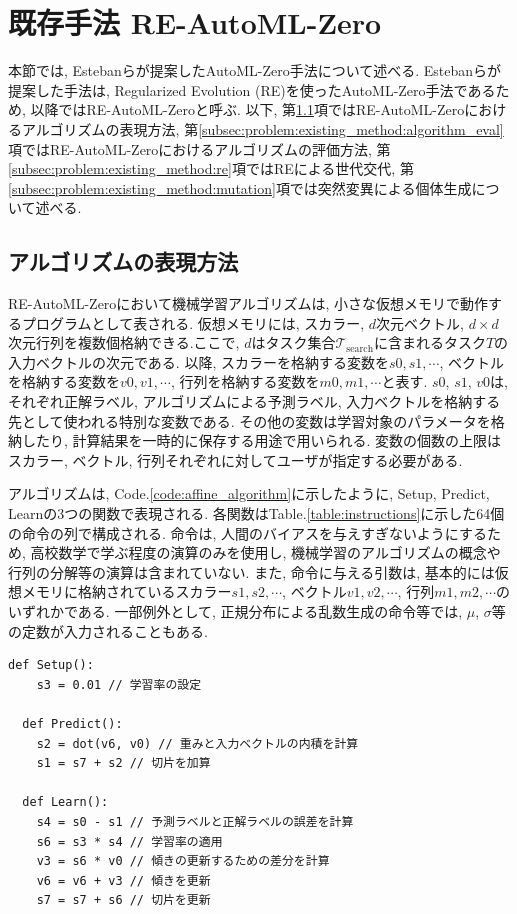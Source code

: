 \documentclass[11pt,oneside,openany,report]{jsbook}
\begin{document}
\section{既存手法 RE-AutoML-Zero}\label{sec:problem:re_automl_zero}

本節では, Estebanらが提案したAutoML-Zero手法について述べる. Estebanらが提案した手法は, Regularized Evolution (RE)を使ったAutoML-Zero手法であるため, 以降ではRE-AutoML-Zeroと呼ぶ. 以下, 第\ref{subsec:problem:existing_method:algorithm_exp}項ではRE-AutoML-Zeroにおけるアルゴリズムの表現方法, 第\ref{subsec:problem:existing_method:algorithm_eval}項ではRE-AutoML-Zeroにおけるアルゴリズムの評価方法, 第\ref{subsec:problem:existing_method:re}項ではREによる世代交代, 第\ref{subsec:problem:existing_method:mutation}項では突然変異による個体生成について述べる.

\subsection{アルゴリズムの表現方法}\label{subsec:problem:existing_method:algorithm_exp}

RE-AutoML-Zeroにおいて機械学習アルゴリズムは, 小さな仮想メモリで動作するプログラムとして表される. 仮想メモリには, スカラー, $d$次元ベクトル, $d \times d$次元行列を複数個格納できる.ここで, $d $はタスク集合$\mathcal{T}_\mathrm{search}$に含まれるタスク$T$の入力ベクトルの次元である. 以降, スカラーを格納する変数を$s0,s1,\cdots$, ベクトルを格納する変数を$v0,v1,\cdots$, 行列を格納する変数を$m0,m1,\cdots$と表す. $s0$, $s1$, $v0$は, それぞれ正解ラベル, アルゴリズムによる予測ラベル, 入力ベクトルを格納する先として使われる特別な変数である. その他の変数は学習対象のパラメータを格納したり, 計算結果を一時的に保存する用途で用いられる. 変数の個数の上限はスカラー, ベクトル, 行列それぞれに対してユーザが指定する必要がある.

アルゴリズムは, Code.\ref{code:affine_algorithm}に示したように, Setup, Predict, Learnの3つの関数で表現される. 各関数はTable.\ref{table:instructions}に示した64個の命令の列で構成される. 命令は, 人間のバイアスを与えすぎないようにするため, 高校数学で学ぶ程度の演算のみを使用し, 機械学習のアルゴリズムの概念や行列の分解等の演算は含まれていない. また, 命令に与える引数は, 基本的には仮想メモリに格納されているスカラー$s1,s2,\cdots$, ベクトル$v1,v2,\cdots$, 行列$m1,m2,\cdots$のいずれかである. 一部例外として, 正規分布による乱数生成の命令等では, $\mu$, $\sigma$等の定数が入力されることもある.

\begin{lstlisting}[caption=アフィン回帰と解釈可能なアルゴリズム,label=code:affine_algorithm]
  def Setup():
    s3 = 0.01 // 学習率の設定

  def Predict():
    s2 = dot(v6, v0) // 重みと入力ベクトルの内積を計算
    s1 = s7 + s2 // 切片を加算

  def Learn():
    s4 = s0 - s1 // 予測ラベルと正解ラベルの誤差を計算
    s6 = s3 * s4 // 学習率の適用
    v3 = s6 * v0 // 傾きの更新するための差分を計算
    v6 = v6 + v3 // 傾きを更新
    s7 = s7 + s6 // 切片を更新
\end{lstlisting}
\end{document}
